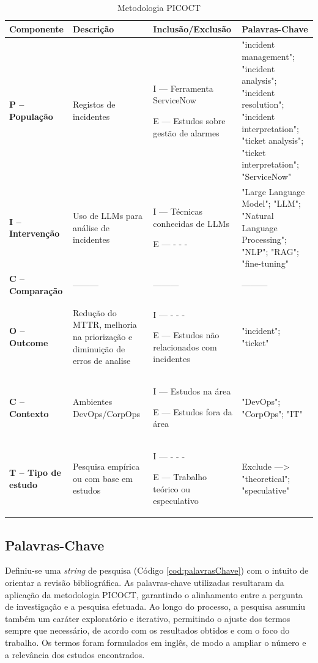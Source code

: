 		\begin{table}[H]
			\centering
			\begin{tabular}{|l|p{3cm}|p{3cm}|p{4cm}|}
				\hline
				\textbf{Componente} & \textbf{Descrição} & \textbf{Inclusão/Exclusão} & \textbf{Palavras-Chave} \\
				\hline
				\textbf{P – População} & Registos de incidentes & I — Ferramenta ServiceNow\newline 
				
				E — Estudos sobre gestão de alarmes & "incident management"; "incident analysis"; "incident resolution"; "incident interpretation"; "ticket analysis"; "ticket interpretation"; "ServiceNow" \\
				\hline
				\textbf{I – Intervenção} & Uso de LLMs para análise de incidentes & I — Técnicas conhecidas de LLMs\newline
				
				E — - - - & "Large Language Model"; "LLM"; "Natural Language Processing"; "NLP"; "RAG"; "fine-tuning" \\
				\hline
				\textbf{C – Comparação} & ——— & ——— & ——— \\
				\hline
				\textbf{O – Outcome} & Redução do MTTR, melhoria na priorização e diminuição de erros de analise & I — - - -\newline
				
				E — Estudos não relacionados com incidentes & "incident"; "ticket" \\
				\hline
				\textbf{C – Contexto} & Ambientes DevOps/CorpOps & I — Estudos na área\newline
				
				E — Estudos fora da área & "DevOps"; "CorpOps"; "IT"\\
				\hline
				\textbf{T – Tipo de estudo} & Pesquisa empírica ou com base em estudos & I — - - -\newline
				
				E — Trabalho teórico ou especulativo & Exclude —> "theoretical"; "speculative" \\
				\hline
			\end{tabular}
			\caption[Metodologia PICOCT]{Metodologia PICOCT}
			\label{tab:picoct}
		\end{table}
		
		
	\subsection{Palavras-Chave}
	
		Definiu-se uma \textit{string} de pesquisa (Código \ref{cod:palavrasChave}) com o intuito de orientar a revisão bibliográfica. As palavras-chave utilizadas resultaram da aplicação da metodologia \gls{PICOCT}, garantindo o alinhamento entre a pergunta de investigação e a pesquisa efetuada. Ao longo do processo, a pesquisa assumiu também um caráter exploratório e iterativo, permitindo o ajuste dos termos sempre que necessário, de acordo com os resultados obtidos e com o foco do trabalho. Os termos foram formulados em inglês, de modo a ampliar o número e a relevância dos estudos encontrados.
	
